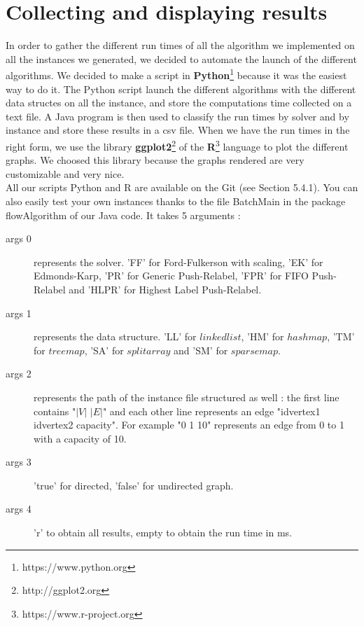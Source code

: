 \section{Collecting and displaying results}




In order to gather the different run times of all the algorithm we implemented on all the instances we generated, we decided to automate the launch of the different algorithms. We decided to make a script in \textbf{Python}\footnote{https://www.python.org} because it was the easiest way to do it. The Python script launch the different algorithms with the different data structes on all the instance, and store the computations time collected on a text file. A Java program is then used to classify the run times by solver and by instance and store these results in a csv file.
When we have the run times in the right form, we use the library \textbf{ggplot2}\footnote{http://ggplot2.org} of the \textbf{R}\footnote{https://www.r-project.org} language to plot the different graphs. We choosed this library because the graphs rendered are very customizable and  very nice. \\

All our scripts Python and R are available on the Git (see Section 5.4.1). You can also easily test your own instances thanks to the file BatchMain in the package flowAlgorithm of our Java code. It takes 5 arguments :

\begin{description}
\item[args 0]{ represents the solver. 'FF' for Ford-Fulkerson with scaling, 'EK' for Edmonds-Karp, 'PR' for Generic Push-Relabel, 'FPR' for FIFO Push-Relabel and 'HLPR' for Highest Label Push-Relabel.}
\item[args 1]{ represents the data structure. 'LL' for $linkedlist$, 'HM' for $hashmap$, 'TM' for $treemap$, 'SA' for $splitarray$ and 'SM' for $sparsemap$.}
\item[args 2]{ represents the path of the instance file structured as well : the first line contains "$|V|$ $|E|$" and each other line represents an edge "idvertex1 idvertex2 capacity". For example "0 1 10" represents an edge from 0 to 1 with a capacity of 10.}
\item[args 3]{'true' for directed, 'false' for undirected graph.}
\item[args 4]{'r' to obtain all results, empty to obtain the run time in ms.}

\end{description} 
\newpage
